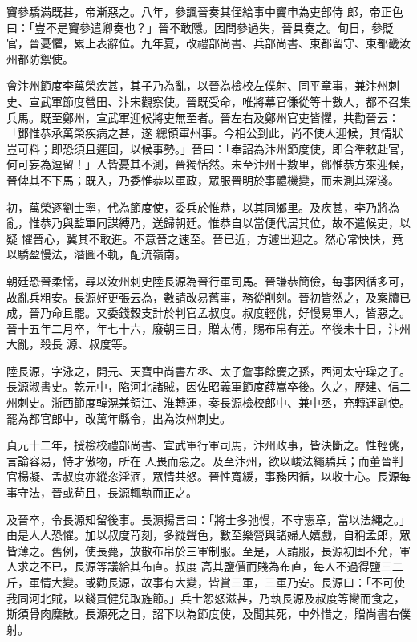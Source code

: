 \begin{pinyinscope}
 竇參驕滿既甚，帝漸惡之。八年，參諷晉奏其侄給事中竇申為吏部侍
 郎，帝正色曰：「豈不是竇參遣卿奏也？」晉不敢隱。因問參過失，晉具奏之。旬日，參貶官，晉憂懼，累上表辭位。九年夏，改禮部尚書、兵部尚書、東都留守、東都畿汝州都防禦使。



 會汴州節度李萬榮疾甚，其子乃為亂，以晉為檢校左僕射、同平章事，兼汴州刺史、宣武軍節度營田、汴宋觀察使。晉既受命，唯將幕官傔從等十數人，都不召集兵馬。既至鄭州，宣武軍迎候將吏無至者。晉左右及鄭州官吏皆懼，共勸晉云：「鄧惟恭承萬榮疾病之甚，遂
 總領軍州事。今相公到此，尚不使人迎候，其情狀豈可料；即恐須且遲回，以候事勢。」晉曰：「奉詔為汴州節度使，即合準敕赴官，何可妄為逗留！」人皆憂其不測，晉獨恬然。未至汴州十數里，鄧惟恭方來迎候，晉俾其不下馬；既入，乃委惟恭以軍政，眾服晉明於事體機變，而未測其深淺。



 初，萬榮逐劉士寧，代為節度使，委兵於惟恭，以其同鄉里。及疾甚，李乃將為亂，惟恭乃與監軍同謀縛乃，送歸朝廷。惟恭自以當便代居其位，故不遣候吏，以疑
 懼晉心，冀其不敢進。不意晉之速至。晉已近，方遽出迎之。然心常怏怏，竟以驕盈慢法，潛圖不軌，配流嶺南。



 朝廷恐晉柔懦，尋以汝州刺史陸長源為晉行軍司馬。晉謙恭簡儉，每事因循多可，故亂兵粗安。長源好更張云為，數請改易舊事，務從削刻。晉初皆然之，及案牘已成，晉乃命且罷。又委錢穀支計於判官孟叔度。叔度輕佻，好慢易軍人，皆惡之。晉十五年二月卒，年七十六，廢朝三日，贈太傅，賜布帛有差。卒後未十日，汴州大亂，殺長
 源、叔度等。



 陸長源，字泳之，開元、天寶中尚書左丞、太子詹事餘慶之孫，西河太守璪之子。長源淑書史。乾元中，陷河北諸賊，因佐昭義軍節度薛嵩卒後。久之，歷建、信二州刺史。浙西節度韓滉兼領江、淮轉運，奏長源檢校郎中、兼中丞，充轉運副使。罷為都官郎中，改萬年縣令，出為汝州刺史。



 貞元十二年，授檢校禮部尚書、宣武軍行軍司馬，汴州政事，皆決斷之。性輕佻，言論容易，恃才傲物，所在
 人畏而惡之。及至汴州，欲以峻法繩驕兵；而董晉判官楊凝、孟叔度亦縱恣淫湎，眾情共怒。晉性寬緩，事務因循，以收士心。長源每事守法，晉或茍且，長源輒執而正之。



 及晉卒，令長源知留後事。長源揚言曰：「將士多弛慢，不守憲章，當以法繩之。」由是人人恐懼。加以叔度苛刻，多縱聲色，數至樂營與諸婦人嬉戲，自稱孟郎，眾皆薄之。舊例，使長薨，放散布帛於三軍制服。至是，人請服，長源初固不允，軍人求之不已，長源等議給其布直。叔度
 高其鹽價而賤為布直，每人不過得鹽三二斤，軍情大變。或勸長源，故事有大變，皆賞三軍，三軍乃安。長源曰：「不可使我同河北賊，以錢買健兒取旌節。」兵士怨怒滋甚，乃執長源及叔度等臠而食之，斯須骨肉糜散。長源死之日，詔下以為節度使，及聞其死，中外惜之，贈尚書右僕射。




\end{pinyinscope}
